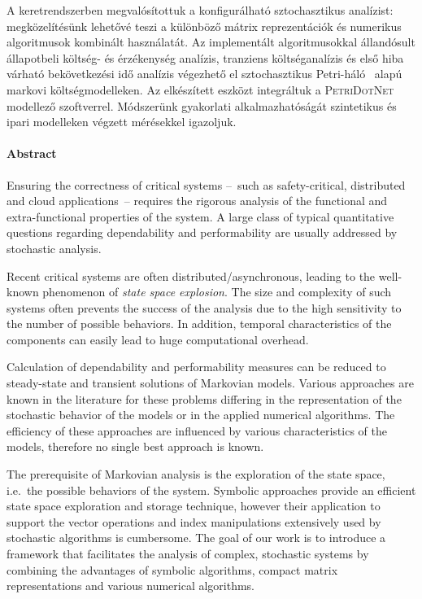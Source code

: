 \begin{otherlanguage}{magyar}
  A keretrendszerben megvalósítottuk a konfigurálható sztochasztikus
  analízist: megközelítésünk lehetővé teszi a különböző
  mátrix reprezentációk és numerikus algoritmusok kombinált
  használatát. Az implementált algoritmusokkal állandósult állapotbeli
  költség- és érzékenység analízis, tranziens költséganalízis és első
  hiba várható bekövetkezési idő analízis végezhető el sztochasztikus
  Petri-háló~ alapú markovi költségmodelleken. Az
  elkészített eszközt integráltuk a \textsc{PetriDotNet} modellező
  szoftverrel. Módszerünk gyakorlati alkalmazhatóságát szintetikus és
  ipari modelleken végzett mérésekkel igazoljuk.

\end{otherlanguage}

\cleardoublepage

\paragraph*{Abstract}
{}
\thispagestyle{plain}

Ensuring the correctness of critical systems --~such as
safety-critical, distributed and cloud applications~-- requires the
rigorous analysis of the functional and extra-functional properties of
the system. A large class of typical quantitative questions regarding
dependability and performability are usually addressed by stochastic
analysis.

Recent critical systems are often distributed/asynchronous, leading to
the well-known phenomenon of \emph{state space explosion}. The size
and complexity of such systems often prevents the success of the
analysis due to the high sensitivity to the number of possible
behaviors. In addition, temporal characteristics of the components can
easily lead to huge computational overhead.

Calculation of dependability and performability measures can be
reduced to steady-state and transient solutions of Markovian
models. Various approaches are known in the literature for these
problems differing in the representation of the stochastic behavior of
the models or in the applied numerical algorithms. The efficiency of
these approaches are influenced by various characteristics of the
models, therefore no single best approach is known.

The prerequisite of Markovian analysis is the exploration of the state
space, i.e.~the possible behaviors of the system. Symbolic approaches
provide an efficient state space exploration and storage technique,
however their application to support the vector operations and index
manipulations extensively used by stochastic algorithms is cumbersome.
The goal of our work is to introduce a framework that facilitates the
analysis of complex, stochastic systems by combining the
advantages of symbolic algorithms, compact matrix representations and
various numerical algorithms.

